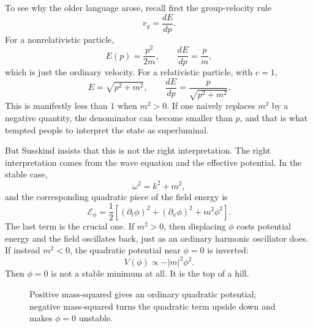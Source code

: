 To see why the older language arose, recall first the group-velocity rule
\begin{equation}
v_g=\frac{dE}{dp}.
\end{equation}
For a nonrelativistic particle,
\begin{equation}
E(p)=\frac{p^2}{2m},
\qquad
\frac{dE}{dp}=\frac{p}{m},
\end{equation}
which is just the ordinary velocity. For a relativistic particle, with \(c=1\),
\begin{equation}
E=\sqrt{p^2+m^2},
\qquad
\frac{dE}{dp}=\frac{p}{\sqrt{p^2+m^2}}.
\end{equation}
This is manifestly less than \(1\) when \(m^2>0\). If one naively replaces \(m^2\) by a negative quantity, the denominator can become smaller than \(p\), and that is what tempted people to interpret the state as superluminal.

But Susskind insists that this is not the right interpretation. The right interpretation comes from the wave equation and the effective potential. In the stable case,
\begin{equation}
\omega^2 = k^2 + m^2,
\end{equation}
and the corresponding quadratic piece of the field energy is
\begin{equation}
\mathcal{E}_\phi
=
\frac12\left[(\partial_t\phi)^2+(\partial_x\phi)^2+m^2\phi^2\right].
\end{equation}
The last term is the crucial one. If \(m^2>0\), then displacing \(\phi\) costs potential energy and the field oscillates back, just as an ordinary harmonic oscillator does. If instead \(m^2<0\), the quadratic potential near \(\phi=0\) is inverted:
\begin{equation}
V(\phi)\propto -|m|^2\phi^2.
\end{equation}
Then \(\phi=0\) is not a stable minimum at all. It is the top of a hill.

\begin{figure}[t]
\centering
{}
\caption{Positive mass-squared gives an ordinary quadratic potential; negative mass-squared turns the quadratic term upside down and makes \(\phi=0\) unstable.}
\end{figure}

